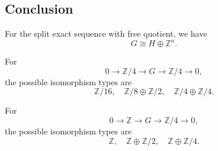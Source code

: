 \documentclass[12pt,a4paper]{article}
\theoremstyle{notespace}
\begin{document}
\subsection{Conclusion}

For the split exact sequence with free quotient, we have
\[
\boxed{G\cong H\oplus \mathbb Z^n.}
\]

For
\[
0\to \mathbb Z/4\to G\to \mathbb Z/4\to 0,
\]
the possible isomorphism types are
\[
\boxed{
	\mathbb Z/16,\quad
	\mathbb Z/8\oplus \mathbb Z/2,\quad
	\mathbb Z/4\oplus \mathbb Z/4.
}
\]

For
\[
0\to \mathbb Z\to G\to \mathbb Z/4\to 0,
\]
the possible isomorphism types are
\[
\boxed{
	\mathbb Z,\quad
	\mathbb Z\oplus \mathbb Z/2,\quad
	\mathbb Z\oplus \mathbb Z/4.
}
\]
\end{document}
